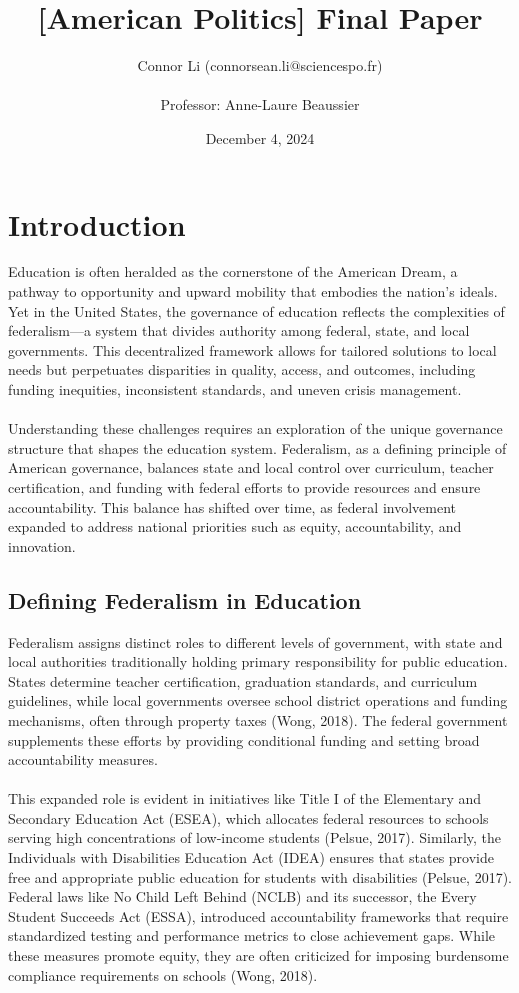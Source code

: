 \documentclass[11pt]{extarticle}
\title{[American Politics] Final Paper}
\author{Connor Li (connorsean.li$@$sciencespo.fr)\\
\\
Professor: Anne-Laure Beaussier}
\date{December 4, 2024}
\begin{document}
\maketitle

\tableofcontents



\pagebreak

\section{Introduction}
Education is often heralded as the cornerstone of the American Dream, a pathway to opportunity and upward mobility that embodies the nation’s ideals. Yet in the United States, the governance of education reflects the complexities of federalism—a system that divides authority among federal, state, and local governments. This decentralized framework allows for tailored solutions to local needs but perpetuates disparities in quality, access, and outcomes, including funding inequities, inconsistent standards, and uneven crisis management.\\
\\
Understanding these challenges requires an exploration of the unique governance structure that shapes the education system. Federalism, as a defining principle of American governance, balances state and local control over curriculum, teacher certification, and funding with federal efforts to provide resources and ensure accountability. This balance has shifted over time, as federal involvement expanded to address national priorities such as equity, accountability, and innovation.

\subsection{Defining Federalism in Education}
Federalism assigns distinct roles to different levels of government, with state and local authorities traditionally holding primary responsibility for public education. States determine teacher certification, graduation standards, and curriculum guidelines, while local governments oversee school district operations and funding mechanisms, often through property taxes (Wong, 2018). The federal government supplements these efforts by providing conditional funding and setting broad accountability measures.\\
\\
This expanded role is evident in initiatives like Title I of the Elementary and Secondary Education Act (ESEA), which allocates federal resources to schools serving high concentrations of low-income students (Pelsue, 2017). Similarly, the Individuals with Disabilities Education Act (IDEA) ensures that states provide free and appropriate public education for students with disabilities (Pelsue, 2017). Federal laws like No Child Left Behind (NCLB) and its successor, the Every Student Succeeds Act (ESSA), introduced accountability frameworks that require standardized testing and performance metrics to close achievement gaps. While these measures promote equity, they are often criticized for imposing burdensome compliance requirements on schools (Wong, 2018).
\end{document}
